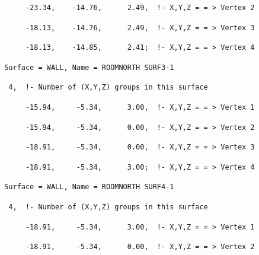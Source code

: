 \begin{lstlisting}
      -23.34,    -14.76,      2.49,  !- X,Y,Z = = > Vertex 2
\end{lstlisting}

\begin{lstlisting}
      -18.13,    -14.76,      2.49,  !- X,Y,Z = = > Vertex 3
\end{lstlisting}

\begin{lstlisting}
      -18.13,    -14.85,      2.41;  !- X,Y,Z = = > Vertex 4
\end{lstlisting}

\begin{lstlisting}
 Surface = WALL, Name = ROOMNORTH SURF3-1
\end{lstlisting}

\begin{lstlisting}
  4,  !- Number of (X,Y,Z) groups in this surface
\end{lstlisting}

\begin{lstlisting}
      -15.94,     -5.34,      3.00,  !- X,Y,Z = = > Vertex 1
\end{lstlisting}

\begin{lstlisting}
      -15.94,     -5.34,      0.00,  !- X,Y,Z = = > Vertex 2
\end{lstlisting}

\begin{lstlisting}
      -18.91,     -5.34,      0.00,  !- X,Y,Z = = > Vertex 3
\end{lstlisting}

\begin{lstlisting}
      -18.91,     -5.34,      3.00;  !- X,Y,Z = = > Vertex 4
\end{lstlisting}

\begin{lstlisting}
 Surface = WALL, Name = ROOMNORTH SURF4-1
\end{lstlisting}

\begin{lstlisting}
  4,  !- Number of (X,Y,Z) groups in this surface
\end{lstlisting}

\begin{lstlisting}
      -18.91,     -5.34,      3.00,  !- X,Y,Z = = > Vertex 1
\end{lstlisting}

\begin{lstlisting}
      -18.91,     -5.34,      0.00,  !- X,Y,Z = = > Vertex 2
\end{lstlisting}

